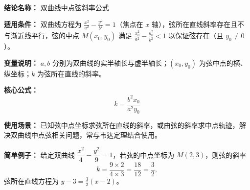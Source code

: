 \textbf{结论名称：} 双曲线中点弦斜率公式

\textbf{适用条件：} 双曲线方程为 \(\displaystyle\frac{x^{2}}{a^{2}}-\frac{y^{2}}{b^{2}}=1\)（焦点在 \(x\) 轴），弦所在直线斜率存在且不与渐近线平行，弦的中点 \(M(x_{0},y_{0})\) 满足 \(\frac{x_0^{2}}{a^{2}}-\frac{y_0^{2}}{b^{2}}<1\) 以保证弦存在（且 \(y_0\neq 0\)）。

\textbf{变量说明：} \(a,b\) 分别为双曲线的实半轴长与虚半轴长；\((x_0,y_0)\) 为弦中点的横、纵坐标；\(k\) 为弦所在直线的斜率。

\textbf{核心公式：} 
\[
\boxed{k = \frac{b^{2}x_{0}}{a^{2}y_{0}}}
\]

\textbf{使用场景：} 已知弦中点坐标求弦所在直线的斜率，或由弦的斜率求中点轨迹，解决双曲线中点弦相关问题，常与韦达定理结合使用。

\textbf{简单例子：} 给定双曲线 \(\dfrac{x^{2}}{4}-\dfrac{y^{2}}{9}=1\)，若弦的中点坐标为 \(M(2,3)\)，则弦的斜率 
\[
k = \frac{9\times 2}{4\times 3} = \frac{18}{12} = \frac{3}{2},
\]
弦所在直线方程为 \(y-3 = \frac{3}{2}(x-2)\)。